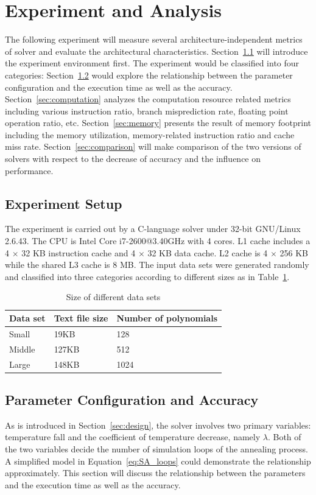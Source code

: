 \section{Experiment and Analysis}
\label{sec:experiment}
The following experiment will measure several architecture-independent metrics of \SA solver and evaluate the architectural characteristics. Section~\ref{sec:setup} will introduce the experiment environment first. The experiment would be classified into four categories: Section~\ref{sec:parameter} would explore the relationship between the parameter configuration and the execution time as well as the accuracy. Section~\ref{sec:computation} analyzes the computation resource related metrics including various instruction ratio, branch misprediction rate, floating point operation ratio, etc. Section~\ref{sec:memory} presents the result of memory footprint including the memory utilization, memory-related instruction ratio and cache miss rate. Section~\ref{sec:comparison} will make comparison of the two versions of \SA solvers with respect to the decrease of accuracy and the influence on performance.
\subsection{Experiment Setup}
\label{sec:setup}
The experiment is carried out by a C-language \SA solver under 32-bit GNU/Linux 2.6.43. The CPU is Intel Core i7-2600@3.40GHz with 4 cores. L1 cache includes a 4 $\times$ 32 KB instruction cache and 4 $\times$ 32 KB data cache. L2 cache is 4 $\times$ 256 KB while the shared L3 cache is 8 MB. The input data sets were generated randomly and classified into three categories according to different sizes as in Table~\ref{tab:sizes}.

\begin{table}
  \centering
  \begin{tabular}{|l|l|l|}\hline
  \textbf{Data set} & \textbf{Text file size} & \textbf{Number of polynomials}\\\hline
  Small & 19KB & 128 \\\hline
  Middle&127KB&512\\\hline
  Large&148KB&1024\\\hline
  \end{tabular}
  \caption{Size of different data sets}\label{tab:sizes}
\end{table}

\subsection{Parameter Configuration and Accuracy}
\label{sec:parameter}
As is introduced in Section~\ref{sec:design}, the solver involves two primary variables: temperature fall and the coefficient of temperature decrease, namely $\lambda$. Both of the two variables decide the number of simulation loops of the annealing process. A simplified model in Equation~\ref{eq:SA_loops} could demonstrate the relationship approximately. This section will discuss the relationship between the parameters and the execution time as well as the accuracy.

